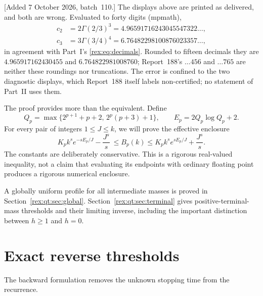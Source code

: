 \begin{remark}\label{rex:qt:rem:decimals}
[Added 7 October 2026, batch~110.] The displays above are printed as
delivered, and both are wrong. Evaluated to forty digits (mpmath),
\begin{align*}
 c_2&=2\Gamma(2/3)^3=4.96591716243045547322\ldots,\\
 c_3&=3\Gamma(3/4)^4=6.76482298100876023357\ldots,
\end{align*}
in agreement with Part~I's \eqref{rex:eq:decimals}. Rounded to fifteen
decimals they are $4.965917162430455$ and $6.764822981008760$; Report~188's
$\ldots456$ and $\ldots765$ are neither these roundings nor truncations.
The error is confined to the two diagnostic displays, which Report~188
itself labels non-certified; no statement of Part~II uses them.
\end{remark}

The proof provides more than the equivalent. Define
\begin{equation}\label{rex:qt:eq:QE}
 Q_p=\max\{2^{p+1}+p+2,\,2^p(p+3)+1\},\qquad
 E_p=2Q_p\log Q_p+2.
\end{equation}
For every pair of integers $1\le J\le k$, we will prove the effective enclosure
\begin{equation}\label{rex:qt:eq:envelope_intro}
 K_p k^s e^{-sE_p/J}-\frac{J^s}{s}
 \ \le B_p(k)\le
 K_p k^s e^{sE_p/J}+\frac{J^s}{s}.
\end{equation}
The constants are deliberately conservative. This is a rigorous real-valued inequality, not a claim that evaluating its endpoints with ordinary floating point produces a rigorous numerical enclosure.

A globally uniform profile for all intermediate masses is proved in Section~\ref{rex:qt:sec:global}. Section~\ref{rex:qt:sec:terminal} gives positive-terminal-mass thresholds and their limiting inverse, including the important distinction between $h\ge1$ and $h=0$.

\section{Exact reverse thresholds}\label{rex:qt:sec:reverse}
The backward formulation removes the unknown stopping time from the recurrence.

